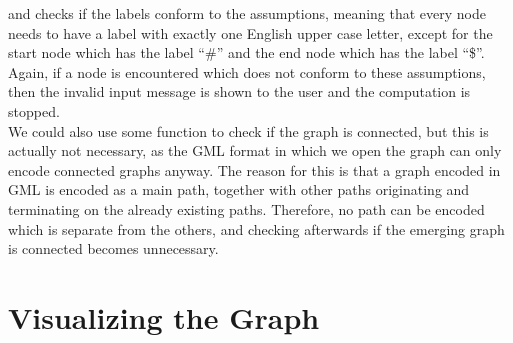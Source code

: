 \documentclass[a4paper,12pt,twoside,BCOR=10mm]{scrbook}
\begin{document}
and checks if the labels conform to the assumptions, meaning that every node needs to have a
label with exactly one English upper case letter, except for the start node which has the label “$\#$” and
the end node which has the label “\$”.
Again, if a node is encountered which does not conform to these assumptions, then the invalid input message
is shown to the user and the computation is stopped. \\
We could also use some function to check if the graph is connected,
but this is actually not necessary, as the GML format in which we open the graph can only encode connected
graphs anyway. The reason for this is that a graph encoded in GML is encoded as a main path,
together with other paths originating and terminating on the already existing paths.
Therefore, no path can be encoded which is separate from the others, and checking afterwards if
the emerging graph is connected becomes unnecessary.

\section{Visualizing the Graph}
%
\end{document}
